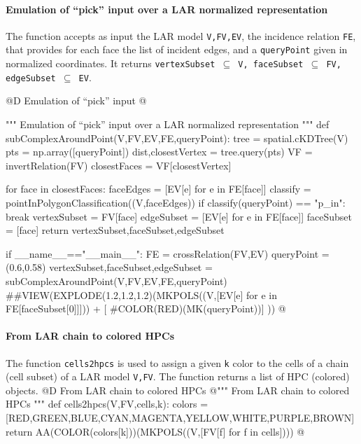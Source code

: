\documentclass[11pt,oneside]{article}    %
\begin{document}
\paragraph{Emulation of  ``pick'' input over a LAR normalized representation}
The function accepts as input the LAR model \texttt{V,FV,EV}, the incidence relation \texttt{FE}, that provides for each face the list of incident edges, and a \texttt{queryPoint} given in normalized coordinates. It returns \texttt{vertexSubset $\subseteq$ V, faceSubset $\subseteq$ FV, edgeSubset $\subseteq$ EV}.

@D Emulation of ``pick'' input 
@{""" Emulation of  ``pick'' input over a LAR normalized representation """
def subComplexAroundPoint(V,FV,EV,FE,queryPoint):
    tree = spatial.cKDTree(V)
    pts = np.array([queryPoint])
    dist,closestVertex = tree.query(pts)
    VF = invertRelation(FV)
    closestFaces = VF[closestVertex]

    for face in closestFaces:
        faceEdges = [EV[e] for e in FE[face]]
        classify = pointInPolygonClassification((V,faceEdges))
        if classify(queryPoint) == "p_in":
            break
    vertexSubset = FV[face]
    edgeSubset = [EV[e] for e in FE[face]]
    faceSubset = [face]
    return vertexSubset,faceSubset,edgeSubset

if __name__=="__main__":
    FE = crossRelation(FV,EV)
    queryPoint = (0.6,0.58)
    vertexSubset,faceSubset,edgeSubset = subComplexAroundPoint(V,FV,EV,FE,queryPoint)
    ##VIEW(EXPLODE(1.2,1.2,1.2)(MKPOLS((V,[EV[e] for e in FE[faceSubset[0]]])) + [
        #COLOR(RED)(MK(queryPoint))] ))
@}



\paragraph{From LAR chain to colored HPCs}
The function \texttt{cells2hpcs} is used to assign a given \texttt{k} color to the cells of a chain (cell subset) of a LAR model \texttt{V,FV}. The function returns a list of HPC (colored) objects.
@D From LAR chain to colored HPCs
@{""" From LAR chain to colored HPCs """
def cells2hpcs(V,FV,cells,k): 
    colors = [RED,GREEN,BLUE,CYAN,MAGENTA,YELLOW,WHITE,PURPLE,BROWN]
    return AA(COLOR(colors[k]))(MKPOLS((V,[FV[f] for f in cells])))
@}
\end{document}
